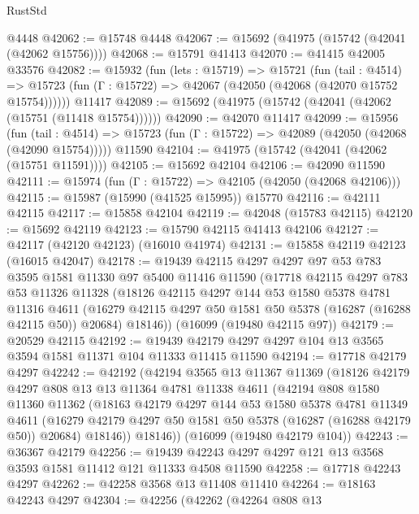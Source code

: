 \begin{lexlean}{RustStd}
\begin{coremodule}
    @4448
@42062 := @15748 @4448
@42067 := @15692 (@41975 (@15742 (@42041 (@42062 @15756))))
@42068 := @15791 @41413
@42070 := @41415 @42005 @33576
@42082 := @15932
    (fun (lets : @15719) =>
    @15721
      (fun (tail : @4514) =>
      @15723 (fun (Γ : @15722) => @42067 (@42050 (@42068 (@42070 @15752 @15754))))))
    @11417
@42089 := @15692 (@41975 (@15742 (@42041 (@42062 (@15751 (@11418 @15754))))))
@42090 := @42070 @11417
@42099 := @15956
    (fun (tail : @4514) => @15723 (fun (Γ : @15722) => @42089 (@42050 (@42068 (@42090 @15754)))))
    @11590
@42104 := @41975 (@15742 (@42041 (@42062 (@15751 @11591))))
@42105 := @15692 @42104
@42106 := @42090 @11590
@42111 := @15974 (fun (Γ : @15722) => @42105 (@42050 (@42068 @42106)))
@42115 := @15987 (@15990 (@41525 @15995)) @15770
@42116 := @42111 @42115
@42117 := @15858 @42104
@42119 := @42048 (@15783 @42115)
@42120 := @15692 @42119
@42123 := @15790 @42115 @41413 @42106
@42127 := @42117 (@42120 @42123) (@16010 @41974)
@42131 := @15858 @42119 @42123 (@16015 @42047)
@42178 := @19439
    @42115
    @4297
    @4297
    @97
    @53
    @783
    @3595
    @1581
    @11330
    @97
    @5400
    @11416
    @11590
    (@17718
      @42115
      @4297
      @783
      @53
      @11326
      @11328
      (@18126
        @42115
        @4297
        @144
        @53
        @1580
        @5378
        @4781
        @11316
        @4611
        (@16279 @42115 @4297 @50 @1581 @50 @5378 (@16287 (@16288 @42115 @50)) @20684)
        @18146))
    (@16099 (@19480 @42115 @97))
@42179 := @20529 @42115
@42192 := @19439 @42179 @4297 @4297 @104 @13 @3565 @3594 @1581 @11371 @104 @11333 @11415 @11590
@42194 := @17718 @42179 @4297
@42242 := @42192
    (@42194
      @3565
      @13
      @11367
      @11369
      (@18126
        @42179
        @4297
        @808
        @13
        @13
        @11364
        @4781
        @11338
        @4611
        (@42194
          @808
          @1580
          @11360
          @11362
          (@18163
            @42179
            @4297
            @144
            @53
            @1580
            @5378
            @4781
            @11349
            @4611
            (@16279 @42179 @4297 @50 @1581 @50 @5378 (@16287 (@16288 @42179 @50)) @20684)
            @18146))
        @18146))
    (@16099 (@19480 @42179 @104))
@42243 := @36367 @42179
@42256 := @19439 @42243 @4297 @4297 @121 @13 @3568 @3593 @1581 @11412 @121 @11333 @4508 @11590
@42258 := @17718 @42243 @4297
@42262 := @42258 @3568 @13 @11408 @11410
@42264 := @18163 @42243 @4297
@42304 := @42256
    (@42262
      (@42264
        @808
        @13

\end{coremodule}
\end{lexlean}
